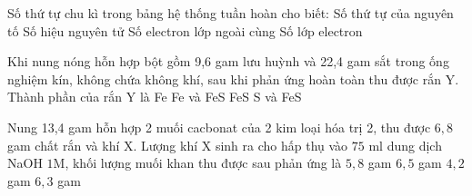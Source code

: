 \begin{ex}
	Số thứ tự chu kì trong bảng hệ thống tuần hoàn cho biết:
	\choice
	{Số thứ tự của nguyên tố}
	{Số hiệu nguyên tử}
	{Số electron lớp ngoài cùng}
	{\True Số lớp electron}
	\loigiai{}
\end{ex}
\begin{ex}
	Khi nung nóng hỗn hợp bột gồm 9,6 gam lưu huỳnh và 22,4 gam sắt trong ống nghiệm kín, không chứa không khí, sau khi phản ứng hoàn toàn thu được rắn Y. Thành phần của rắn Y là
	\choice
	{Fe}
	{\True Fe và FeS}
	{FeS}
	{S và FeS}
	\loigiai{}
\end{ex}
\begin{ex}
	Nung 13,4 gam hỗn hợp 2 muối cacbonat của 2 kim loại hóa trị 2, thu được $6{,}8$ gam chất rắn và khí X. Lượng khí X sinh ra cho hấp thụ vào $75$ ml dung dịch NaOH $1$M, khối lượng muối khan thu được sau phản ứng là
	\choice
	{$5{,}8$ gam}
	{$6{,}5$ gam}
	{$4{,}2 $gam}
	{\True $6{,}3$ gam}
	\loigiai{}
\end{ex}


